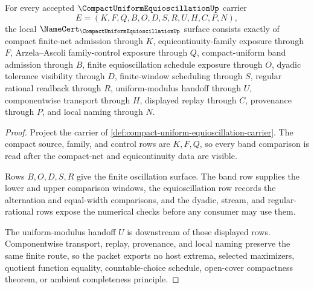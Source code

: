 \begin{theorem}
\label{thm:compact-uniform-equioscillation-obligation-surface}
For every accepted $\CompactUniformEquioscillationUp$ carrier
$$
E=(K,F,Q,B,O,D,S,R,U,H,C,P,N),
$$
the local $\NameCert_{\CompactUniformEquioscillationUp}$ surface consists exactly of compact finite-net admission through $K$, equicontinuity-family exposure through $F$, Arzela--Ascoli family-control exposure through $Q$, compact-uniform band admission through $B$, finite equioscillation schedule exposure through $O$, dyadic tolerance visibility through $D$, finite-window scheduling through $S$, regular rational readback through $R$, uniform-modulus handoff through $U$, componentwise transport through $H$, displayed replay through $C$, provenance through $P$, and local naming through $N$.
\end{theorem}
\begin{proof}
Project the carrier of \autoref{def:compact-uniform-equioscillation-carrier}. The compact source, family, and control rows are $K,F,Q$, so every band comparison is read after the compact-net and equicontinuity data are visible.

Rows $B,O,D,S,R$ give the finite oscillation surface. The band row supplies the lower and upper comparison windows, the equioscillation row records the alternation and equal-width comparisons, and the dyadic, stream, and regular-rational rows expose the numerical checks before any consumer may use them.

The uniform-modulus handoff $U$ is downstream of those displayed rows. Componentwise transport, replay, provenance, and local naming preserve the same finite route, so the packet exports no host extrema, selected maximizers, quotient function equality, countable-choice schedule, open-cover compactness theorem, or ambient completeness principle.
\end{proof}

